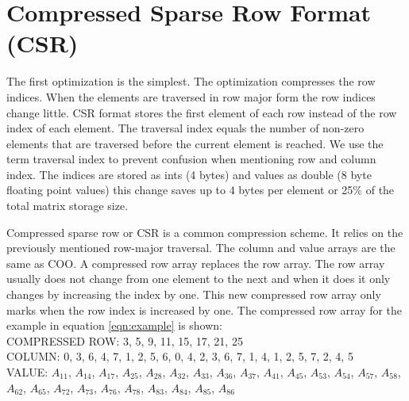 \section{Compressed Sparse Row Format (CSR)}
The first optimization is the simplest. The optimization compresses the row indices. When the elements are traversed in row major form the row indices change little. CSR format stores the first element of each row instead of the row index of each element. The traversal index equals the number of non-zero elements that are traversed before the current element is reached. We use the term traversal index to prevent confusion when mentioning row and column index. The indices are stored as ints (4 bytes) and values as double (8 byte floating point values) this change saves up to 4 bytes per element or 25\% of the total matrix storage size.
\par Compressed sparse row or CSR is a common compression scheme. It relies on the previously mentioned row-major traversal. The column and value arrays are the same as COO. A compressed row array replaces the row array. The row array usually does not change from one element to the next and when it does it only changes by increasing the index by one. This new compressed row array only marks when the row index is increased by one. The compressed row array for the example in equation \ref{eqn:example} is shown: \\
COMPRESSED ROW: 3, 5, 9, 11, 15, 17, 21, 25 \\
COLUMN: 0, 3, 6, 4, 7, 1, 2, 5, 6, 0, 4, 2, 3, 6, 7, 1, 4, 1, 2, 5, 7, 2, 4, 5\\ 
VALUE: $A_{11}$, $A_{14}$, $A_{17}$, $A_{25}$, $A_{28}$, $A_{32}$, $A_{33}$, $A_{36}$, $A_{37}$, $A_{41}$, $A_{45}$, $A_{53}$, $A_{54}$, $A_{57}$, $A_{58}$, $A_{62}$, $A_{65}$, $A_{72}$, $A_{73}$, $A_{76}$, $A_{78}$, $A_{83}$, $A_{84}$, $A_{85}$, $A_{86}$ \par
